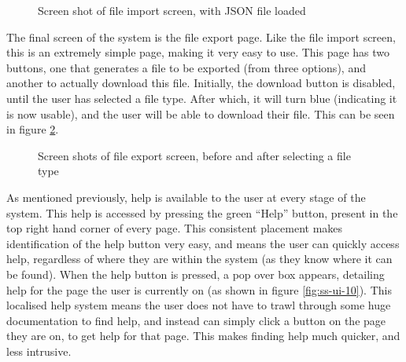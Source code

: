 \begin{figure}[ht!]
	\begin{center}
	\end{center}
	\vspace{-6mm}
	\caption{Screen shot of file import screen, with JSON file loaded}
	\label{fig:ss-ui-7}
	\vspace{-3mm}	
\end{figure}

\noindent
The final screen of the system is the file export page. Like the file import screen, this is an extremely simple page, making it very easy to use. This page has two buttons, one that generates a file to be exported (from three options), and another to actually download this file. Initially, the download button is disabled, until the user has selected a file type. After which, it will turn blue (indicating it is now usable), and the user will be able to download their file. This can be seen in figure \ref{fig:ss-ui-8}.

\begin{figure}[ht!]
	\vspace{-1mm}
	\begin{center}
	\end{center}
	\vspace{-6mm}
	\caption{Screen shots of file export screen, before and after selecting a file type}
	\label{fig:ss-ui-8}
\end{figure}
\noindent
As mentioned previously, help is available to the user at every stage of the system. This help is accessed by pressing the green ``Help'' button, present in the top right hand corner of every page. This consistent placement makes identification of the help button very easy, and means the user can quickly access help, regardless of where they are within the system (as they know where it can be found). When the help button is pressed, a pop over box appears, detailing help for the page the user is currently on (as shown in figure \ref{fig:ss-ui-10}). This localised help system means the user does not have to trawl through some huge documentation to find help, and instead can simply click a button on the page they are on, to get help for that page. This makes finding help much quicker, and less intrusive.

